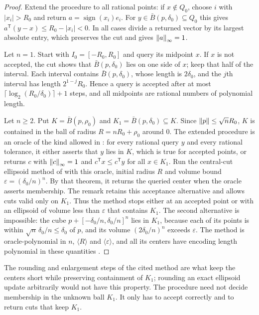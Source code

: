 \begin{proof}
Extend the procedure to all rational points: if $x\notin Q_0$, choose $i$
with $|x_i|>R_0$ and return $a=\operatorname{sign}(x_i)e_i$. For
$y\in\bar B(p,\delta_0)\subseteq Q_0$ this gives
$a^{\mathsf T}(y-x)\le R_0-|x_i|<0$. In all cases divide a returned vector by
its largest absolute entry, which preserves the cut and gives
$\left\lVert a\right\rVert_\infty=1$.

Let $n=1$. Start with $I_0=[-R_0,R_0]$ and query its midpoint $x$. If $x$ is
not accepted, the cut shows that $\bar B(p,\delta_0)$ lies on one side of
$x$; keep that half of the interval. Each interval contains
$\bar B(p,\delta_0)$, whose length is $2\delta_0$, and the $j$th interval has
length $2^{1-j}R_0$. Hence a query is accepted after at most
$\lceil\log_2(R_0/\delta_0)\rceil+1$ steps, and all midpoints are rational
numbers of polynomial length.

Let $n\ge2$. Put $K=\bar B(p,\rho_0)$ and $K_1=\bar B(p,\delta_0)\subseteq K$.
Since $\left\lVert p\right\rVert\le\sqrt nR_0$, $K$ is contained in the ball of radius
$R=nR_0+\rho_0$ around $0$. The extended procedure is an oracle of the kind
allowed in \citet[Remark~3.2.33]{GroetschelLovaszSchrijver1988}: for every
rational query $y$ and every rational tolerance, it either asserts that $y$
lies in $K$, which is true for accepted points, or returns $c$ with
$\left\lVert c\right\rVert_\infty=1$ and $c^{\mathsf T}x\le c^{\mathsf T}y$ for all $x\in K_1$.
Run the central-cut ellipsoid method of
\citet[Theorem~3.2.1]{GroetschelLovaszSchrijver1988} with this oracle,
initial radius $R$ and volume bound $\varepsilon=(\delta_0/n)^n$. By that
theorem, it returns the queried center when the oracle asserts membership.
The remark retains this acceptance alternative and allows cuts valid only on
$K_1$. Thus the method stops either at an accepted point or with an ellipsoid
of volume less than $\varepsilon$ that contains $K_1$. The second alternative is
impossible: the cube $p+[-\delta_0/n,\delta_0/n]^n$ lies in $K_1$, because
each of its points is within $\sqrt n\,\delta_0/n\le\delta_0$ of $p$, and its
volume $(2\delta_0/n)^n$ exceeds $\varepsilon$. The method is
oracle-polynomial in $n$, $\langle R\rangle$ and $\langle\varepsilon\rangle$,
and all its centers have encoding length polynomial in these quantities
\citep[Lemma~3.2.8]{GroetschelLovaszSchrijver1988}.
\end{proof}

The rounding and enlargement steps of the cited method are what keep the
centers short while preserving containment of $K_1$; rounding an exact
ellipsoid update arbitrarily would not have this property. The procedure need
not decide membership in the unknown ball $K_1$. It only has to accept
correctly and to return cuts that keep $K_1$.

